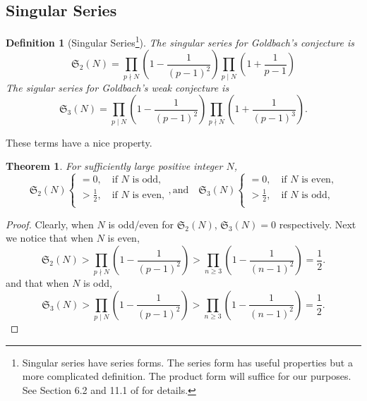 \documentclass{article}
\newtheorem{theorem}{Theorem}
\newtheorem{definition}{Definition}
\begin{document}
\subsection{Singular Series}
\begin{definition}[Singular Series\footnote{Singular series have series forms. The series form has useful properties but a more complicated definition. The product form will suffice for our purposes. See Section 6.2 and 11.1 of \cite{pan} for details.}] The singular series for Goldbach's conjecture is 
\begin{equation*}
    \mathfrak{S}_2(N) = \prod_{p \nmid N} \left(1 - \frac{1}{(p - 1)^2} \right) 
\prod_{p \mid N} \left(1 + \frac{1}{p - 1} \right)
\end{equation*}
The sigular series for Goldbach's weak conjecture is
\begin{equation*}
    \mathfrak{S}_3(N) = \prod_{p \mid N} \left( 1 - \frac{1}{(p - 1)^2} \right) \prod_{p \nmid N} \left( 1 + \frac{1}{(p - 1)^3} \right).
\end{equation*}
\end{definition}
These terms have a nice property.
\begin{theorem} \label{single} For sufficiently large positive integer $N$,
\begin{equation*}
    \mathfrak{S}_2(N) \begin{cases}
        = 0, \quad \text{if $N$ is odd,}\\
        > \frac{1}{2}, \quad \text{if $N$ is even,}\\
    \end{cases}, \text{and} \quad \mathfrak{S}_3(N) \begin{cases}
        = 0, \quad \text{if $N$ is even,}\\
        > \frac{1}{2}, \quad \text{if $N$ is odd,}\\
    \end{cases}
\end{equation*}
\end{theorem}
\begin{proof}
    Clearly, when $N$ is odd/even for $\mathfrak{S}_2(N)$, $\mathfrak{S}_3(N) = 0$ respectively. Next we notice that when $N$ is even,
    \begin{equation*}
    \mathfrak{S}_2(N) > \prod_{p \nmid N} \left(1 - \frac{1}{(p - 1)^2} \right) > \prod_{n \geq 3} \left(1 - \frac{1}{(n - 1)^2} \right) = \frac{1}{2}.
\end{equation*}
and that when $N$ is odd,
\begin{equation*}
    \mathfrak{S}_3(N) > \prod_{p \mid N} \left(1 - \frac{1}{(p - 1)^2} \right) > \prod_{n \geq 3} \left(1 - \frac{1}{(n - 1)^2} \right) = \frac{1}{2}.
\end{equation*}
\end{proof}
\end{document}
